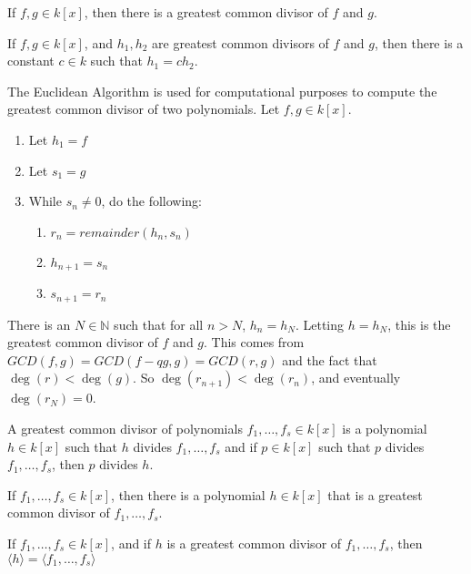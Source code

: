 \documentclass[../main.tex]{subfiles}
\begin{document}
\begin{theorem}
If $f,g\in k[x]$, then there is a greatest common divisor of $f$ and $g$.
\end{theorem}

\begin{theorem}
If $f,g\in k[x]$, and $h_1,h_2$ are greatest common divisors of $f$ and $g$, then there is a constant $c\in k$ such that $h_1 = ch_2$.
\end{theorem}

\begin{remark}
The Euclidean Algorithm is used for computational purposes to compute the greatest common divisor of two polynomials. Let $f,g\in k[x]$.
\begin{enumerate}
\item Let $h_1 = f$
\item Let $s_1 = g$
\item While $s_n \ne 0$, do the following:
\begin{enumerate}
\item $r_n = remainder(h_n,s_n)$
\item $h_{n+1} = s_n$
\item $s_{n+1} = r_n$
\end{enumerate}
\end{enumerate}
There is an $N\in \mathbb{N}$ such that for all $n>N$, $h_n = h_N$. Letting $h = h_N$, this is the greatest common divisor of $f$ and $g$. This comes from $GCD(f,g) = GCD(f-qg,g) = GCD(r,g)$ and the fact that $\deg(r)< \deg(g)$. So $\deg(r_{n+1})<\deg(r_n)$, and eventually $\deg(r_N) = 0$.
\end{remark}

\begin{definition}
A greatest common divisor of polynomials $f_1,\hdots, f_s \in k[x]$ is a polynomial $h\in k[x]$ such that $h$ divides $f_1,\hdots, f_s$ and if $p\in k[x]$ such that $p$ divides $f_1,\hdots, f_s$, then $p$ divides $h$.
\end{definition}

\begin{theorem}
If $f_1,\hdots, f_s\in k[x]$, then there is a polynomial $h\in k[x]$ that is a greatest common divisor of $f_1,\hdots, f_s$.
\end{theorem}

\begin{theorem}
If $f_1,\hdots, f_s\in k[x]$, and if $h$ is a greatest common divisor of $f_1,\hdots, f_s$, then $\langle h \rangle = \langle f_1,\hdots, f_s\rangle$
\end{theorem}
\end{document}

